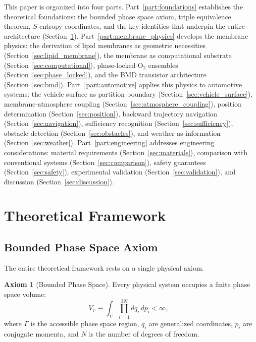 \documentclass[twocolumn,10pt]{article}
\theoremstyle{definition}
\newtheorem{axiom}{Axiom}
\theoremstyle{remark}
\newcommand{\VGamma}{V_{\Gamma}}
\begin{document}
This paper is organized into four parts. Part~\ref{part:foundations} establishes the theoretical foundations: the bounded phase space axiom, triple equivalence theorem, $S$-entropy coordinates, and the key identities that underpin the entire architecture (Section~\ref{sec:framework}). Part~\ref{part:membrane_physics} develops the membrane physics: the derivation of lipid membranes as geometric necessities (Section~\ref{sec:lipid_membrane}), the membrane as computational substrate (Section~\ref{sec:computational}), phase-locked $\mathrm{O}_2$ ensembles (Section~\ref{sec:phase_locked}), and the BMD transistor architecture (Section~\ref{sec:bmd}). Part~\ref{part:automotive} applies this physics to automotive systems: the vehicle surface as partition boundary (Section~\ref{sec:vehicle_surface}), membrane-atmosphere coupling (Section~\ref{sec:atmosphere_coupling}), position determination (Section~\ref{sec:position}), backward trajectory navigation (Section~\ref{sec:navigation}), sufficiency recognition (Section~\ref{sec:sufficiency}), obstacle detection (Section~\ref{sec:obstacles}), and weather as information (Section~\ref{sec:weather}). Part~\ref{part:engineering} addresses engineering considerations: material requirements (Section~\ref{sec:materials}), comparison with conventional systems (Section~\ref{sec:comparison}), safety guarantees (Section~\ref{sec:safety}), experimental validation (Section~\ref{sec:validation}), and discussion (Section~\ref{sec:discussion}).


\section{Theoretical Framework}
\label{sec:framework}

\subsection{Bounded Phase Space Axiom}

The entire theoretical framework rests on a single physical axiom.

\begin{axiom}[Bounded Phase Space]
\label{ax:bounded}
Every physical system occupies a finite phase space volume:
\begin{equation}
  \VGamma \equiv \int_{\Gamma} \prod_{i=1}^{3N} dq_i\, dp_i < \infty,
  \label{eq:bounded_phase}
\end{equation}
where $\Gamma$ is the accessible phase space region, $q_i$ are generalized coordinates, $p_i$ are conjugate momenta, and $N$ is the number of degrees of freedom.
\end{axiom}
\end{document}
